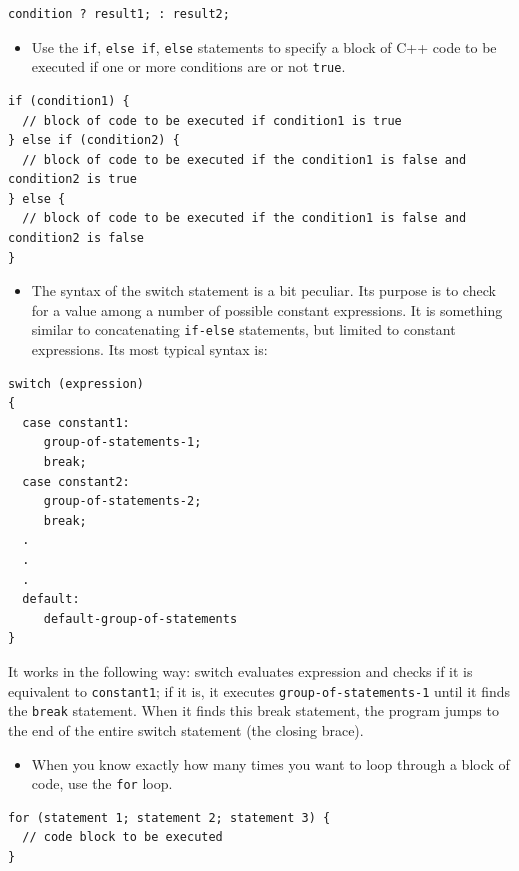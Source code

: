\begin{verbatim}
condition ? result1; : result2;
\end{verbatim}

\begin{itemize}
\tightlist
\item
  Use the \texttt{if}, \texttt{else\ if}, \texttt{else} statements to specify a block of C++ code to be executed if one or more conditions are or not \texttt{true}.
\end{itemize}

\begin{verbatim}
if (condition1) {
  // block of code to be executed if condition1 is true
} else if (condition2) {
  // block of code to be executed if the condition1 is false and condition2 is true
} else {
  // block of code to be executed if the condition1 is false and condition2 is false
}
\end{verbatim}

\begin{itemize}
\tightlist
\item
  The syntax of the switch statement is a bit peculiar. Its purpose is to check for a value among a number of possible constant expressions. It is something similar to concatenating \texttt{if-else} statements, but limited to constant expressions. Its most typical syntax is:
\end{itemize}

\begin{verbatim}
switch (expression)
{
  case constant1:
     group-of-statements-1;
     break;
  case constant2:
     group-of-statements-2;
     break;
  .
  .
  .
  default:
     default-group-of-statements
}
\end{verbatim}

It works in the following way: switch evaluates expression and checks if it is equivalent to \texttt{constant1}; if it is, it executes \texttt{group-of-statements-1} until it finds the \texttt{break} statement. When it finds this break statement, the program jumps to the end of the entire switch statement (the closing brace).

\begin{itemize}
\tightlist
\item
  When you know exactly how many times you want to loop through a block of code, use the \texttt{for} loop.
\end{itemize}

\begin{verbatim}
for (statement 1; statement 2; statement 3) {
  // code block to be executed
}
\end{verbatim}

